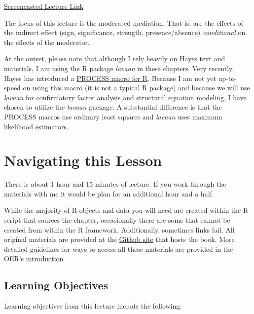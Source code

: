 \documentclass[
  11pt,
]{book}
\begin{document}
\href{https://spu.hosted.panopto.com/Panopto/Pages/Viewer.aspx?pid=1d28d076-efad-4471-b52d-ad1601826f92}{Screencasted Lecture Link}

The focus of this lecture is the moderated mediation. That is, are the effects of the indirect effect (sign, significance, strength, presence/absence) \emph{conditional} on the effects of the moderator.

At the outset, please note that although I rely heavily on Hayes \citeyearpar{hayes_introduction_2018} text and materials, I am using the R package \emph{lavaan} in these chapters. Very recently, Hayes has introduced a \href{https://www.processmacro.org/index.html}{PROCESS macro for R}. Because I am not yet up-to-speed on using this macro (it is not a typical R package) and because we will use \emph{lavaan} for confirmatory factor analysis and structural equation modeling, I have chosen to utilize the \emph{lavaan} package. A substantial difference is that the PROCESS macros use ordinary least squares and \emph{lavaan} uses maximum likelihood estimators.

\hypertarget{navigating-this-lesson-7}{%
\section{Navigating this Lesson}\label{navigating-this-lesson-7}}

There is about 1 hour and 15 minutes of lecture. If you work through the materials with me it would be plan for an additional hour and a half.

While the majority of R objects and data you will need are created within the R script that sources the chapter, occasionally there are some that cannot be created from within the R framework. Additionally, sometimes links fail. All original materials are provided at the \href{https://https://github.com/lhbikos/ReC_MultivModel}{Github site} that hosts the book. More detailed guidelines for ways to access all these materials are provided in the OER's \protect\hyperlink{ReCintro}{introduction}

\hypertarget{learning-objectives-7}{%
\subsection{Learning Objectives}\label{learning-objectives-7}}

Learning objectives from this lecture include the following:
\end{document}
